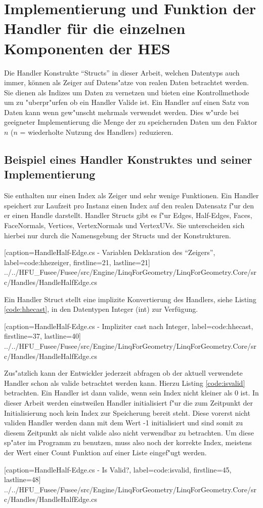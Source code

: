 \documentclass[pagesize, paper=a4, fontsize=12pt,titlepage=true, headings=small, headnosepline, abstractoff, liststotoc, nochapterprefix, plainheadsepline]{scrreprt}
\begin{document}
	\section {Implementierung und Funktion der Handler für die einzelnen Komponenten der HES}
Die Handler Konstrukte "`Structs"' in dieser Arbeit, welchen Datentyps auch immer, können als Zeiger auf Datens"atze von realen Daten betrachtet werden. Sie dienen als Indizes um Daten zu vernetzen und bieten eine Kontrollmethode um zu "uberpr"urfen ob ein Handler Valide ist. Ein Handler auf einen Satz von Daten kann wenn gew"unscht mehrmals verwendet werden. Dies w"urde bei geeigneter Implementierung die Menge der zu speichernden Daten um den Faktor \(n\) (\(n\) = wiederholte Nutzung des Handlers) reduzieren.
		\subsection {Beispiel eines Handler Konstruktes und seiner Implementierung}
Sie enthalten nur einen Index als Zeiger und sehr wenige Funktionen. Ein Handler speichert zur Laufzeit pro Instanz einen Index auf den realen Datensatz f"ur den er einen Handle darstellt. Handler Structs gibt es f"ur Edges, Half-Edges, Faces, FaceNormals, Vertices, VertexNormals und VertexUVs. Sie unterscheiden sich hierbei nur durch die Namensgebung der Structs und der Konstrukturen.

			[caption={HandleHalf-Edge.cs - Variablen Deklaration des "`Zeigers"'}, label=code:hhezeiger, firstline=21, lastline=21]
			{../../HFU_Fusee/Fusee/src/Engine/LinqForGeometry/LinqForGeometry.Core/src/Handles/HandleHalfEdge.cs}

Ein Handler Struct stellt eine implizite Konvertierung des Handlers, siehe Listing \ref{code:hhecast}, in den Datentypen Integer (int) zur Verfügung.

			[caption={HandleHalf-Edge.cs - Impliziter cast nach Integer}, label=code:hhecast, firstline=37, lastline=40]
			{../../HFU_Fusee/Fusee/src/Engine/LinqForGeometry/LinqForGeometry.Core/src/Handles/HandleHalfEdge.cs}

Zus"atzlich kann der Entwickler jederzeit abfragen ob der aktuell verwendete Handler schon als valide betrachtet werden kann. Hierzu Listing \ref{code:isvalid} betrachten. Ein Handler ist dann valide, wenn sein Index nicht kleiner als 0 ist. In dieser Arbeit werden einstweilen Handler initialisiert f"ur die zum Zeitpunkt der Initialisierung noch kein Index zur Speicherung bereit steht. Diese vorerst nicht validen Handler werden dann mit dem Wert -1 initialisiert und sind somit zu diesem Zeitpunkt als nicht valide also nicht verwendbar zu betrachten. Um diese sp"ater im Programm zu benutzen, muss also noch der korrekte Index, meistens der Wert einer Count Funktion auf einer Liste eingef"ugt werden.

			[caption={HandleHalf-Edge.cs - Is Valid?}, label=code:isvalid, firstline=45, lastline=48]
			{../../HFU_Fusee/Fusee/src/Engine/LinqForGeometry/LinqForGeometry.Core/src/Handles/HandleHalfEdge.cs}
\end{document}
